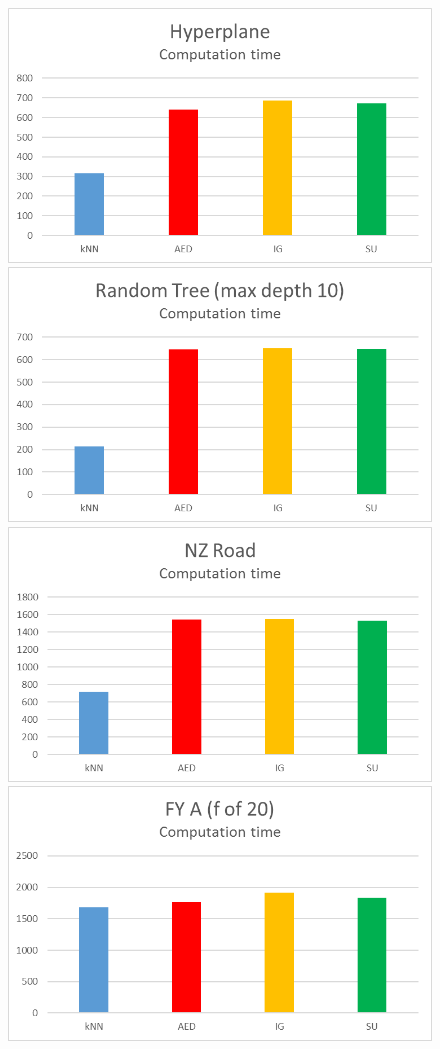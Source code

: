 \begin{figure}[h]
\begin{center}
\includegraphics[scale=0.17]{Graphs/Hyperplane/time}
\includegraphics[scale=0.17]{Graphs/TreeD10/time}
\includegraphics[scale=0.17]{Graphs/NZRoad/time}
\includegraphics[scale=0.17]{Graphs/FY_A/time20}

\end{center}
\end{figure}
